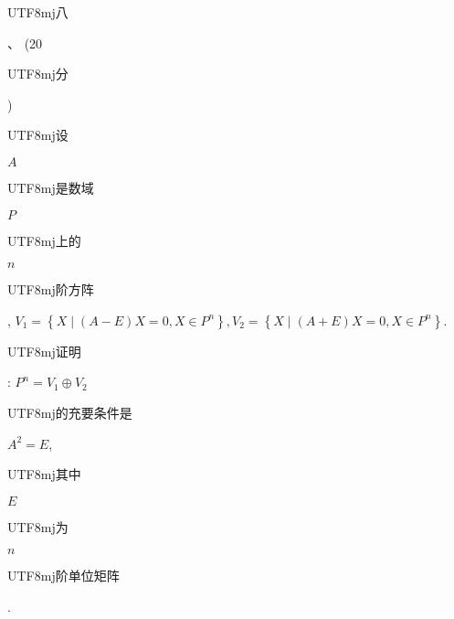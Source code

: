 \documentclass[10pt]{article}
\begin{document}
\begin{CJK}{UTF8}{mj}八\end{CJK}、 (20 \begin{CJK}{UTF8}{mj}分\end{CJK}) \begin{CJK}{UTF8}{mj}设\end{CJK} $A$ \begin{CJK}{UTF8}{mj}是数域\end{CJK} $P$ \begin{CJK}{UTF8}{mj}上的\end{CJK} $n$ \begin{CJK}{UTF8}{mj}阶方阵\end{CJK}, $V_{1}=\left\{X \mid(A-E) X=0, X \in P^{n}\right\}, V_{2}=\left\{X \mid(A+E) X=0, X \in P^{n}\right\}$. \begin{CJK}{UTF8}{mj}证明\end{CJK}: $P^{n}=V_{1} \oplus V_{2}$ \begin{CJK}{UTF8}{mj}的充要条件是\end{CJK} $A^{2}=E$, \begin{CJK}{UTF8}{mj}其中\end{CJK} $E$ \begin{CJK}{UTF8}{mj}为\end{CJK} $n$ \begin{CJK}{UTF8}{mj}阶单位矩阵\end{CJK}.
\end{document}
